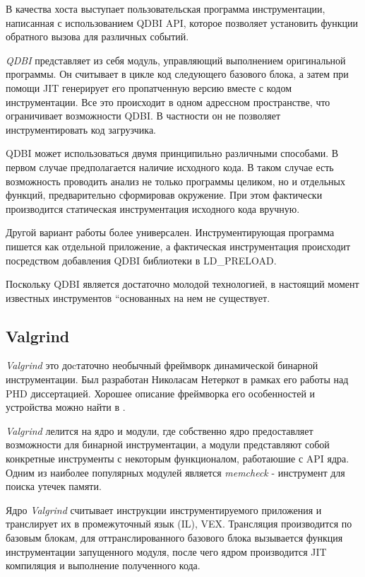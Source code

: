 В качества хоста выступает пользовательская программа инструментации, написанная с использованием QDBI API, которое позволяет установить функции обратного вызова для различных событий.

\emph{QDBI} представляет из себя модуль, управляющий выполнением оригинальной программы. Он считывает в цикле код следующего базового блока, а затем при помощи JIT генерирует его пропатченную версию вместе с кодом инструментации. Все это происходит в одном адрессном пространстве, что ограничивает возможности QDBI. В частности он не позволяет инструментировать код загрузчика.

QDBI может использоваться двумя принципильно различными способами. В первом случае предполагается наличие исходного кода. В таком случае есть возможность проводить анализ не только программы целиком, но и отдельных функций, предварительно сформировав окружение. При этом фактически производится статическая инструментация исходного кода вручную.

Другой вариант работы более универсален. Инструментирующая программа пишется как отдельной приложение, а фактическая инструментация происходит посредством добавления QDBI библиотеки в LD\_PRELOAD.

Поскольку QDBI является достаточно молодой технологией, в настоящий момент известных инструментов ``основанных на нем не существует.


\subsection{Valgrind}

\emph{Valgrind} это доcтаточно необычный фреймворк динамической бинарной инструментации. Был разработан Николасам Нетеркот в рамках его работы над PHD диссертацией. Хорошее описание фреймворка его особенностей и устройства можно найти в \cite{VALGRIND}.


\emph{Valgrind} лелится на ядро и модули, где собственно ядро предоставляет возможности для бинарной инструментации, а модули представляют собой конкретные инструменты с некоторым функционалом, работаюшие с API ядра. Одним из наиболее популярных модулей является \emph{memcheck} - инструмент для поиска утечек памяти.

Ядро \emph{Valgrind} считывает инструкции инструментируемого приложения и транслирует их в промежуточный язык (IL), VEX. Трансляция производится по базовым блокам, для оттранслированного базового блока вызывается функция инструментации запущенного модуля, после чего ядром производится JIT компиляция и выполнение полученного кода.

